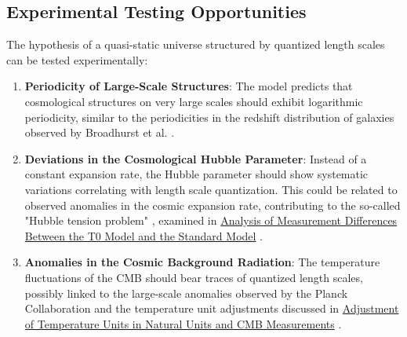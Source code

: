 \documentclass[12pt,a4paper]{article}
\begin{document}
		\subsection{Experimental Testing Opportunities}
		\label{subsec:experimentelle_pruefung_kosmologie}
		
		The hypothesis of a quasi-static universe structured by quantized length scales can be tested experimentally:
		
		\begin{enumerate}
			\item \textbf{Periodicity of Large-Scale Structures}: The model predicts that cosmological structures on very large scales should exhibit logarithmic periodicity, similar to the periodicities in the redshift distribution of galaxies observed by Broadhurst et al. \cite{broadhurst1990}.
			
			\item \textbf{Deviations in the Cosmological Hubble Parameter}: Instead of a constant expansion rate, the Hubble parameter should show systematic variations correlating with length scale quantization. This could be related to observed anomalies in the cosmic expansion rate, contributing to the so-called "Hubble tension problem" \cite{riess2019}, examined in \href{https://github.com/jpascher/T0-Time-Mass-Duality/blob/main/2/pdf/English/MessdifferenzenT0StandardEn.pdf}{Analysis of Measurement Differences Between the T0 Model and the Standard Model} \cite{pascher_messdifferenzen_2025}.
			
			\item \textbf{Anomalies in the Cosmic Background Radiation}: The temperature fluctuations of the CMB should bear traces of quantized length scales, possibly linked to the large-scale anomalies observed by the Planck Collaboration \cite{planck2018} and the temperature unit adjustments discussed in \href{https://github.com/jpascher/T0-Time-Mass-Duality/blob/main/2/pdf/English/TempEinheitenCMBEn.pdf}{Adjustment of Temperature Units in Natural Units and CMB Measurements} \cite{pascher_temp_2025}.
		\end{enumerate}
		
\end{document}
